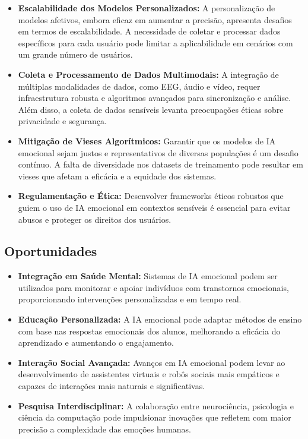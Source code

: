 \documentclass[a4paper,12pt]{report}
\begin{document}
	\begin{itemize}
		\item \textbf{Escalabilidade dos Modelos Personalizados:} A personalização de modelos afetivos, embora eficaz em aumentar a precisão, apresenta desafios em termos de escalabilidade. A necessidade de coletar e processar dados específicos para cada usuário pode limitar a aplicabilidade em cenários com um grande número de usuários.
		\item \textbf{Coleta e Processamento de Dados Multimodais:} A integração de múltiplas modalidades de dados, como EEG, áudio e vídeo, requer infraestrutura robusta e algoritmos avançados para sincronização e análise. Além disso, a coleta de dados sensíveis levanta preocupações éticas sobre privacidade e segurança.
		\item \textbf{Mitigação de Vieses Algorítmicos:} Garantir que os modelos de IA emocional sejam justos e representativos de diversas populações é um desafio contínuo. A falta de diversidade nos datasets de treinamento pode resultar em vieses que afetam a eficácia e a equidade dos sistemas.
		\item \textbf{Regulamentação e Ética:} Desenvolver frameworks éticos robustos que guiem o uso de IA emocional em contextos sensíveis é essencial para evitar abusos e proteger os direitos dos usuários.
	\end{itemize}
	
	\subsection{Oportunidades}
	
	\begin{itemize}
		\item \textbf{Integração em Saúde Mental:} Sistemas de IA emocional podem ser utilizados para monitorar e apoiar indivíduos com transtornos emocionais, proporcionando intervenções personalizadas e em tempo real.
		\item \textbf{Educação Personalizada:} A IA emocional pode adaptar métodos de ensino com base nas respostas emocionais dos alunos, melhorando a eficácia do aprendizado e aumentando o engajamento.
		\item \textbf{Interação Social Avançada:} Avanços em IA emocional podem levar ao desenvolvimento de assistentes virtuais e robôs sociais mais empáticos e capazes de interações mais naturais e significativas.
		\item \textbf{Pesquisa Interdisciplinar:} A colaboração entre neurociência, psicologia e ciência da computação pode impulsionar inovações que refletem com maior precisão a complexidade das emoções humanas.
	\end{itemize}
	
\end{document}
